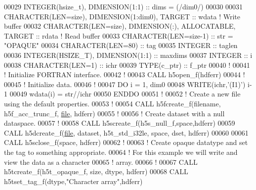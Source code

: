 \begin{DoxyCode}
00029   \textcolor{keywordtype}{INTEGER(hsize\_t)},   \textcolor{keywordtype}{DIMENSION(1:1)} :: dims = (/dim0/)
00030 
00031   \textcolor{keywordtype}{CHARACTER(LEN=size)}, \textcolor{keywordtype}{DIMENSION(1:dim0)}, \textcolor{keywordtype}{TARGET} :: wdata \textcolor{comment}{! Write buffer}
00032   \textcolor{keywordtype}{CHARACTER(LEN=size)}, \textcolor{keywordtype}{DIMENSION(:)}, \textcolor{keywordtype}{ALLOCATABLE}, \textcolor{keywordtype}{TARGET} :: rdata \textcolor{comment}{! Read buffer}
00033   \textcolor{keywordtype}{CHARACTER(LEN=size-1)} :: str = \textcolor{stringliteral}{"OPAQUE"}
00034   \textcolor{keywordtype}{CHARACTER(LEN=80)} :: tag
00035   \textcolor{keywordtype}{INTEGER} :: taglen
00036   \textcolor{keywordtype}{INTEGER(HSIZE\_T)}, \textcolor{keywordtype}{DIMENSION(1:1)} :: maxdims
00037   \textcolor{keywordtype}{INTEGER} :: i
00038   \textcolor{keywordtype}{CHARACTER(LEN=1)} :: ichr
00039   \textcolor{keywordtype}{TYPE}(c\_ptr) :: f\_ptr
00040   \textcolor{comment}{!}
00041   \textcolor{comment}{! Initialize FORTRAN interface.}
00042   \textcolor{comment}{!}
00043   \textcolor{keyword}{CALL }h5open\_f(hdferr)
00044   \textcolor{comment}{!}
00045   \textcolor{comment}{! Initialize data.}
00046   \textcolor{comment}{!}
00047   \textcolor{keywordflow}{DO} i = 1, dim0
00048      \textcolor{keyword}{WRITE}(ichr,\textcolor{stringliteral}{'(I1)'}) i-1 
00049      wdata(i) = str//ichr
00050 \textcolor{keywordflow}{  ENDDO}
00051   \textcolor{comment}{!}
00052   \textcolor{comment}{! Create a new file using the default properties.}
00053   \textcolor{comment}{!}
00054   \textcolor{keyword}{CALL }h5fcreate\_f(filename, h5f\_acc\_trunc\_f, \hyperlink{structfile}{file}, hdferr)
00055   \textcolor{comment}{!}
00056   \textcolor{comment}{! Create dataset with a null dataspace.}
00057   \textcolor{comment}{!}
00058   \textcolor{keyword}{CALL }h5screate\_f(h5s\_null\_f,space,hdferr)
00059   \textcolor{keyword}{CALL }h5dcreate\_f(\hyperlink{structfile}{file}, dataset, h5t\_std\_i32le, space, dset, hdferr)
00060 
00061   \textcolor{keyword}{CALL }h5sclose\_f(space, hdferr)
00062   \textcolor{comment}{!}
00063   \textcolor{comment}{! Create opaque datatype and set the tag to something appropriate.}
00064   \textcolor{comment}{! For this example we will write and view the data as a character}
00065   \textcolor{comment}{! array.}
00066   \textcolor{comment}{!}
00067   \textcolor{keyword}{CALL }h5tcreate\_f(h5t\_opaque\_f, \textcolor{keyword}{size}, dtype, hdferr)
00068   \textcolor{keyword}{CALL }h5tset\_tag\_f(dtype,\textcolor{stringliteral}{"Character array"},hdferr)

\end{DoxyCode}
